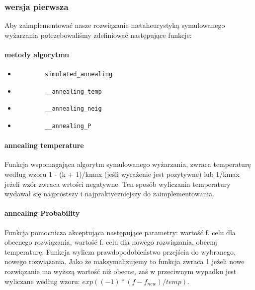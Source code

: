 \documentclass{article}
\begin{document}
\subsubsection{wersja pierwsza}
Aby zaimplementować nasze rozwiązanie metaheurystyką symulowanego wyżarzania potrzebowaliśmy zdefiniować następujące funkcje:
\paragraph{metody algorytmu}
\begin{itemize}
	\item \begin{verbatim}
		simulated_annealing
	\end{verbatim}

	\item \begin{verbatim}
		__annealing_temp
	\end{verbatim}

	\item \begin{verbatim}
		__annealing_neig
	\end{verbatim}

	\item \begin{verbatim}
		__annealing_P
	\end{verbatim}

\end{itemize}

\paragraph{annealing temperature}
Funkcja wspomagająca algorytm symulowanego wyżarzania, zwraca temperaturę według wzoru 1 - (k + 1)/kmax (jeśli wyrażenie jest pozytywne) lub 1/kmax jeżeli wzór zwraca wrtości negatywne.
Ten sposób wyliczania temperatury wydawał się najprostszy i najpraktyczniejszy do zaimplementowania.

\paragraph{annealing Probability}
Funkcja pomocnicza akceptująca następujące parametry: wartość f. celu dla obecnego rozwiązania, wartość f. celu dla nowego rozwiązania, obecną temperaturę. Funkcja wylicza prawdopodobieństwo przejścia do wybranego, nowego rozwiązania.
Jako że maksymalizujemy to funkcja zwraca 1 jeżeli nowe rozwiązanie ma wyższą wartość niż obecne, zaś w przeciwnym wypadku jest wyliczane według wzoru: $ exp( (-1)* (f - f_{new}) / temp ) $.
\end{document}
